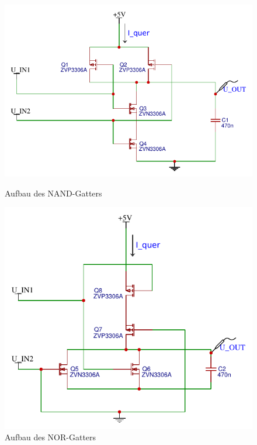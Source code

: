 \documentclass[11pt, a4paper]{article}
\begin{document}
\begin{figure}[htb]
    \centering
    \begin{minipage}[t]{0.45\linewidth}
        \centering
        \includegraphics[width=\linewidth]{NAND.pdf}
        \caption{Aufbau des NAND-Gatters}
        \label{aufbauNAND}
    \end{minipage}%
    \hfill
    \begin{minipage}[t]{0.45\linewidth}
        \centering
        \includegraphics[width=\linewidth]{NOR.pdf}
        \caption{Aufbau des NOR-Gatters}
        \label{aufbauNOR}
    \end{minipage}
\end{figure}
\end{document}
